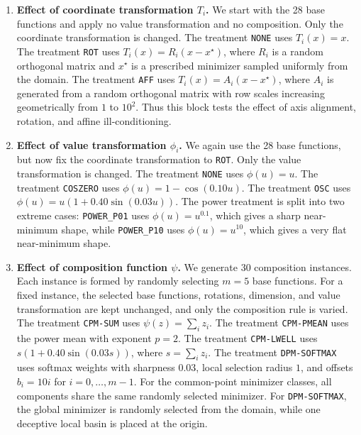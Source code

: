 \documentclass[journal]{IEEEtran}
\theoremstyle{remark}
\theoremstyle{plain}
\begin{document}
\begin{enumerate}
	\item \textbf{Effect of coordinate transformation \(T_i\).} We start with the 28 base functions and
		apply no value transformation and no composition. Only the coordinate
		transformation is changed. The treatment \texttt{NONE} uses
		\(T_i(x)=x\). The treatment \texttt{ROT} uses
		\(T_i(x)=R_i(x-x^\star)\), where \(R_i\) is a random orthogonal
		matrix and \(x^\star\) is a prescribed minimizer sampled uniformly
		from the domain. The treatment \texttt{AFF} uses
		\(T_i(x)=A_i(x-x^\star)\), where \(A_i\) is generated from a random
		orthogonal matrix with row scales increasing geometrically from
		\(1\) to \(10^2\). Thus this block tests the effect of axis
		alignment, rotation, and affine ill-conditioning.
	\item \textbf{Effect of value transformation \(\phi_i\).} We again use the 28 base functions,
		but now fix the coordinate transformation to \texttt{ROT}. Only the
		value transformation is changed. The treatment \texttt{NONE} uses
		\(\phi(u)=u\). The treatment \texttt{COSZERO} uses
		\(\phi(u)=1-\cos(0.10u)\). The treatment \texttt{OSC} uses
		\(\phi(u)=u(1+0.40\sin(0.03u))\). The power treatment is split into
		two extreme cases: \texttt{POWER\_P01} uses \(\phi(u)=u^{0.1}\),
		which gives a sharp near-minimum shape, while \texttt{POWER\_P10}
		uses \(\phi(u)=u^{10}\), which gives a very flat near-minimum
		shape.
	\item \textbf{Effect of composition function \(\psi\).} We generate 30 composition instances.
		Each instance is formed by randomly selecting \(m=5\) base functions.
		For a fixed instance, the selected base functions, rotations,
		dimension, and value transformation are kept unchanged, and only the
		composition rule is varied. The treatment \texttt{CPM-SUM} uses
		\(\psi(z)=\sum_i z_i\). The treatment \texttt{CPM-PMEAN} uses the
		power mean with exponent \(p=2\). The treatment \texttt{CPM-LWELL}
		uses \(s(1+0.40\sin(0.03s))\), where \(s=\sum_i z_i\). The treatment
		\texttt{DPM-SOFTMAX} uses softmax weights with sharpness \(0.03\),
		local selection radius \(1\), and offsets \(b_i=10i\) for
		\(i=0,\ldots,m-1\). For the common-point minimizer classes, all
		components share the same randomly selected minimizer. For
		\texttt{DPM-SOFTMAX}, the global minimizer is randomly selected from
		the domain, while one deceptive local basin is placed at the origin.
\end{enumerate}
\end{document}
